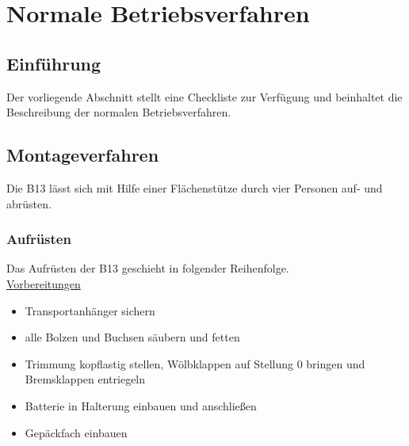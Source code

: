\chapter{Normale Betriebsverfahren}
\pagecolor{white}
\section{Einführung}
Der vorliegende Abschnitt stellt eine Checkliste zur Verfügung und beinhaltet die Beschreibung der normalen Betriebsverfahren.

\section{Montageverfahren}
Die B13 lässt sich mit Hilfe einer Flächenstütze durch vier Personen auf- und abrüsten.

\subsection{Aufrüsten}
Das Aufrüsten der B13 geschieht in folgender Reihenfolge.\\
\newline
\underline{Vorbereitungen}
\begin{itemize}
\item Transportanhänger sichern
\item alle Bolzen und Buchsen säubern und fetten
\item Trimmung kopflastig stellen, Wölbklappen auf Stellung 0 bringen und Bremsklappen entriegeln
\item Batterie in Halterung einbauen und anschließen
\item Gepäckfach einbauen

\end{itemize}

